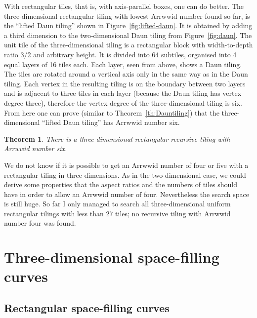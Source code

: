 \documentclass[11pt,a4paper]{article}
\newtheorem{theorem}{Theorem}
\begin{document}
\label{sec:3dliftedDaun}
With rectangular tiles, that is, with axis-parallel boxes, one can do better. The three-dimensional rectangular tiling with lowest Arrwwid number found so far, is the ``lifted Daun tiling'' shown in Figure~\ref{fig:lifted-daun}. It is obtained by adding a third dimension to the two-dimensional Daun tiling from Figure~\ref{fig:daun}. The unit tile of the three-dimensional tiling is a rectangular block with width-to-depth ratio 3/2 and arbitrary height. It is divided into 64 subtiles, organised into 4 equal layers of 16 tiles each. Each layer, seen from above, shows a Daun tiling. The tiles are rotated around a vertical axis only in the same way as in the Daun tiling. Each vertex in the resulting tiling is on the boundary between two layers and is adjacent to three tiles in each layer (because the Daun tiling has vertex degree three), therefore the vertex degree of the three-dimensional tiling is six. From here one can prove (similar to Theorem~\ref{th:Dauntiling}) that the three-dimensional ``lifted Daun tiling'' has Arrwwid number six.

\begin{theorem}\label{th:lifteddauntiling}
There is a three-dimensional rectangular recursive tiling with Arrwwid number six.
\end{theorem}

We do not know if it is possible to get an Arrwwid number of four or five with a rectangular tiling in three dimensions. As in the two-dimensional case, we could derive some properties that the aspect ratios and the numbers of tiles should have in order to allow an Arrwwid number of four. Nevertheless the search space is still huge. So far I only managed to search all three-dimensional uniform rectangular tilings with less than 27 tiles; no recursive tiling with Arrwwid number four was found.

\section{Three-dimensional space-filling curves}

\subsection{Rectangular space-filling curves}
\end{document}
